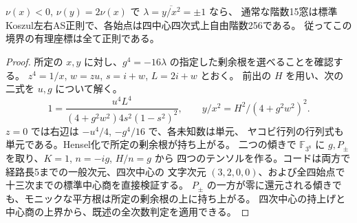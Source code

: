 \begin{theorem}\label{thm:rank-fifteen-negative-x-prime-slopes}
$\nu(x)<0$, $\nu(y)=2\nu(x)$ で $\lambda=\overline{y/x^2}=\pm1$ なら、
通常な階数15窓は標準Koszul左右AS正則で、各始点は四中心四次式上自由階数256である。
従ってこの境界の有理座標は全て正則である。
\end{theorem}
\begin{proof}
所定の $x,y$ に対し、$g^4=-16\lambda$ の指定した剰余根を選べることを確認する。
$z^4=1/x$, $w=zu$, $s=i+w$, $L=2i+w$ とおく。
前出の $H$ を用い、次の二式を $u,g$ について解く。
\[
  1=\frac{u^4L^4}{(4+g^2w^2)4s^2(1-s^2)^2},\qquad
  y/x^2=H^2/(4+g^2w^2)^2 .
\]
$z=0$ では右辺は $-u^4/4$, $-g^4/16$ で、各未知数は単元、
ヤコビ行列の行列式も単元である。Hensel化で所定の剰余根が持ち上がる。
二つの傾きで $\mathbb F_{3^8}$ に $g,P_\pm$ を取り、$K=1$, $n=-ig$, $H/n=g$ から
四つのテンソルを作る。コードは両方で経路長5までの一般次元、四次中心の
文字次元 $(3,2,0,0)$、および全四始点で十三次までの標準中心商を直接検証する。
$P_\pm$ の一方が零に還元される傾きでも、モニックな平方根は所定の剰余根の上に持ち上がる。
四次中心の持上げと中心商の上界から、既述の全次数判定を適用できる。
\end{proof}

